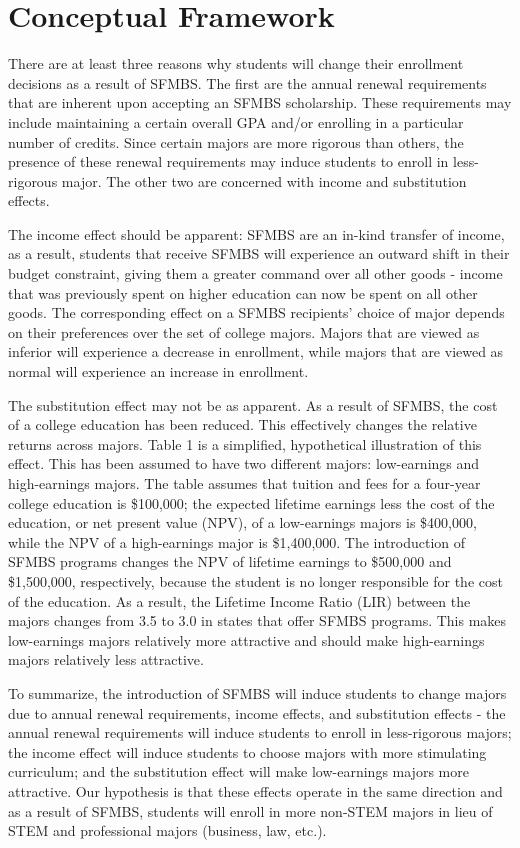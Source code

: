 \documentclass[a4paper]{article}
\begin{document}
\section{Conceptual Framework}
\label{sec:theory}

There are at least three reasons why students will change their enrollment decisions as a result of SFMBS. The first are the annual renewal requirements that are inherent upon accepting an SFMBS scholarship. These requirements may include maintaining a certain overall GPA and/or enrolling in a particular number of credits. Since certain majors are more rigorous than others, the presence of these renewal requirements may induce students to enroll in less-rigorous major. The other two are concerned with income and substitution effects.

The income effect should be apparent: SFMBS are an in-kind transfer of income, as a result, students that receive SFMBS will experience an outward shift in their budget constraint, giving them a greater command over all other goods - income that was previously spent on higher education can now be spent on all other goods. The corresponding effect on a SFMBS recipients’ choice of major depends on their preferences over the set of college majors. Majors that are viewed as inferior will experience a decrease in enrollment, while majors that are viewed as normal will experience an increase in enrollment. 

The substitution effect may not be as apparent. As a result of SFMBS, the cost of a college education has been reduced. This effectively changes the relative returns across majors. Table 1 is a simplified, hypothetical illustration of this effect. This has been assumed to have two different majors: low-earnings and high-earnings majors. The table assumes that tuition and fees for a four-year college education is \$100,000; the expected lifetime earnings less the cost of the education, or net present value (NPV), of a low-earnings majors is \$400,000, while the NPV of a high-earnings major is \$1,400,000. The introduction of SFMBS programs changes the NPV of lifetime earnings to \$500,000 and \$1,500,000, respectively, because the student is no longer responsible for the cost of the education. As a result, the Lifetime Income Ratio (LIR) between the majors changes from 3.5 to 3.0 in states that offer SFMBS programs. This makes low-earnings majors relatively more attractive and should make high-earnings majors relatively less attractive. 

To summarize, the introduction of SFMBS will induce students to change majors due to annual renewal requirements, income effects, and substitution effects - the annual renewal requirements will induce students to enroll in less-rigorous majors; the income effect will induce students to choose majors with more stimulating curriculum; and the substitution effect will make low-earnings majors more attractive. Our hypothesis is that these effects operate in the same direction and as a result of SFMBS, students will enroll in more non-STEM majors in lieu of STEM and professional majors (business, law, etc.). 
\end{document}
